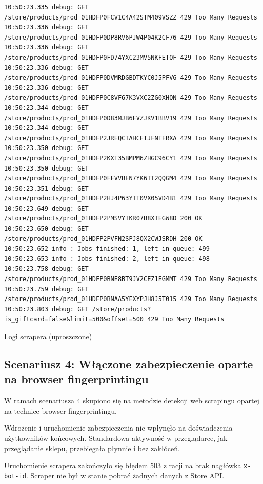 \begin{listing}[p]
\begin{verbatim}
10:50:23.335 debug: GET /store/products/prod_01HDFP0FCV1C4A42STM409VSZZ 429 Too Many Requests
10:50:23.336 debug: GET /store/products/prod_01HDFP0DP8RV6PJW4P04K2CF76 429 Too Many Requests
10:50:23.336 debug: GET /store/products/prod_01HDFP0FD74YXC23MV5NKFETQF 429 Too Many Requests
10:50:23.336 debug: GET /store/products/prod_01HDFP0DVMRDGBDTKYC0J5PFV6 429 Too Many Requests
10:50:23.336 debug: GET /store/products/prod_01HDFP0C8VF67K3VXC2ZG0XHQN 429 Too Many Requests
10:50:23.344 debug: GET /store/products/prod_01HDFP0D83MJB6FVZJKV1BBV19 429 Too Many Requests
10:50:23.344 debug: GET /store/products/prod_01HDFP2JREQCTAHCFTJFNTFRXA 429 Too Many Requests
10:50:23.350 debug: GET /store/products/prod_01HDFP2KXT35BMPM6ZHGC96CY1 429 Too Many Requests
10:50:23.350 debug: GET /store/products/prod_01HDFP0FFVVBEN7YK6TT2QQGM4 429 Too Many Requests
10:50:23.351 debug: GET /store/products/prod_01HDFP2HJ4P63YTT0VX05VD4B1 429 Too Many Requests
10:50:23.649 debug: GET /store/products/prod_01HDFP2PMSVYTKR07B8XTEGW8D 200 OK
10:50:23.650 debug: GET /store/products/prod_01HDFP2PVFN2SPJ8QX2CWJSRDH 200 OK
10:50:23.652 info : Jobs finished: 1, left in queue: 499
10:50:23.653 info : Jobs finished: 2, left in queue: 498
10:50:23.758 debug: GET /store/products/prod_01HDFP0BNE8BT9JV2CEZ1EGMMT 429 Too Many Requests
10:50:23.759 debug: GET /store/products/prod_01HDFP0BNAA5YEXYPJH8J5T015 429 Too Many Requests
10:50:23.803 debug: GET /store/products?is_giftcard=false&limit=500&offset=500 429 Too Many Requests
    \end{verbatim}
    \caption{Logi scrapera (uproszczone)}
    \label{lst:rate-limiting-scraper-logs}
\end{listing}

\subsection{Scenariusz 4: Włączone zabezpieczenie oparte na browser fingerprintingu}\label{subsec:scenariusz-3:-waczone-zabezpieczenie-oparte-na-browser-fingerprintingu}

W ramach scenariusza 4 skupiono się na metodzie detekcji web scrapingu opartej na technice browser fingerprintingu.

Wdrożenie i uruchomienie zabezpieczenia nie wpłynęło na doświadczenia użytkowników końcowych.
Standardowa aktywność w przeglądarce, jak przeglądanie sklepu, przebiegała płynnie i bez zakłóceń.

Uruchomienie scrapera zakończyło się błędem 503 z racji na brak nagłówka \texttt{x-bot-id}.
Scraper nie był w stanie pobrać żadnych danych z Store API\@.

